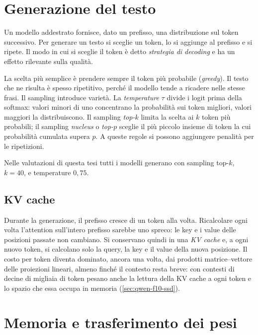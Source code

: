 \section{Generazione del testo}

Un modello addestrato fornisce, dato un prefisso, una distribuzione sul token successivo. Per generare un testo si sceglie un token, lo si aggiunge al prefisso e si ripete. Il modo in cui si sceglie il token è detto \emph{strategia di decoding} e ha un effetto rilevante sulla qualità.

La scelta più semplice è prendere sempre il token più probabile (\emph{greedy}). Il testo che ne risulta è spesso ripetitivo, perché il modello tende a ricadere nelle stesse frasi. Il sampling introduce varietà. La \emph{temperature} $\tau$ divide i logit prima della softmax: valori minori di uno concentrano la probabilità sui token migliori, valori maggiori la distribuiscono. Il sampling \emph{top-$k$} \cite{fan2018hierarchical} limita la scelta ai $k$ token più probabili; il sampling \emph{nucleus} o \emph{top-$p$} \cite{holtzman2020curious} sceglie il più piccolo insieme di token la cui probabilità cumulata supera $p$. A queste regole si possono aggiungere penalità per le ripetizioni.

Nelle valutazioni di questa tesi tutti i modelli generano con sampling top-$k$, $k=40$, e temperature $0{,}75$.

\subsection{KV cache}

Durante la generazione, il prefisso cresce di un token alla volta. Ricalcolare ogni volta l'attention sull'intero prefisso sarebbe uno spreco: le key e i value delle posizioni passate non cambiano. Si conservano quindi in una \emph{KV cache} e, a ogni nuovo token, si calcolano solo la query, la key e il value della nuova posizione. Il costo per token diventa dominato, ancora una volta, dai prodotti matrice--vettore delle proiezioni lineari, almeno finché il contesto resta breve: con contesti di decine di migliaia di token pesano anche la lettura della KV cache a ogni token e lo spazio che essa occupa in memoria (\autoref{sec:qwen-f10-ssd}).

\section{Memoria e trasferimento dei pesi}
\label{sec:memoria-trasferimento}

